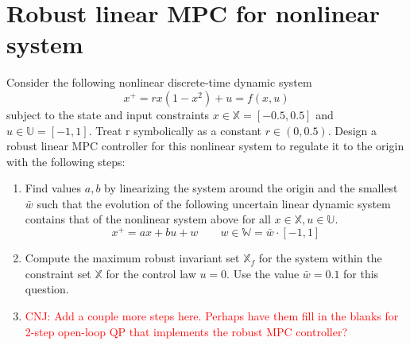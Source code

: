 \section{Robust linear MPC for nonlinear system}
Consider the following nonlinear discrete-time dynamic system 
\begin{equation*}
    x^+ = rx(1-x^2) + u = f(x,u)
\end{equation*}
subject to the state and input constraints $x \in \mathbb{X} = [-0.5, 0.5]$ and $u \in \mathbb{U} = [-1, 1]$. Treat r symbolically as a constant $ r \in (0, 0.5)$. Design a robust linear MPC controller for this nonlinear system to regulate it to the origin with the following steps: 
\begin{enumerate}
    \item Find values $a, b$ by linearizing the system around the origin and the smallest $\bar{w}$ such that the evolution of the following uncertain linear dynamic system contains that of the nonlinear system above for all $x \in \mathbb{X}, u \in \mathbb{U}$. 
    \begin{equation*}
        x^+ = ax + bu + w \qquad w \in \mathbb{W} = \bar{w} \cdot [-1, 1]
    \end{equation*}\vspace{5\baselineskip}
    \item Compute the maximum robust invariant set $\mathbb{X}_f$ for the system within the constraint set $\mathbb{X}$ for the control law $u = 0$. Use the value $\bar{w}= 0.1$ for this question. 
    \item \textcolor{red}{CNJ: Add a couple more steps here. Perhaps have them fill in the blanks for 2-step open-loop QP that implements the robust MPC controller?}
\end{enumerate}
